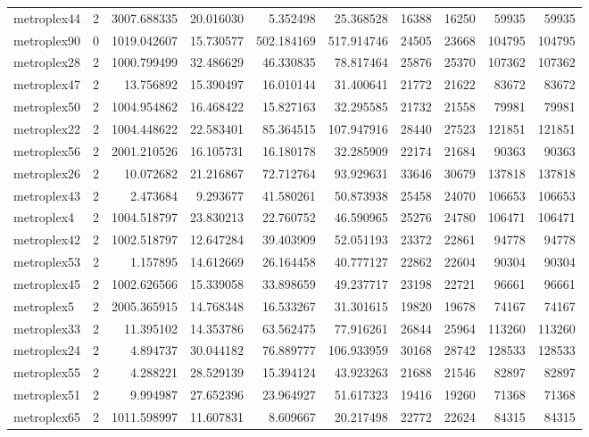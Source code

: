 \begin{longtable}{|l|r|r|r|r|r|r|r|r|r|}
metroplex44 & 2 & 3007.688335 & 20.016030 & 5.352498 & 25.368528 & 16388 & 16250 & 59935 & 59935 \\
metroplex90 & 0 & 1019.042607 & 15.730577 & 502.184169 & 517.914746 & 24505 & 23668 & 104795 & 104795 \\
metroplex28 & 2 & 1000.799499 & 32.486629 & 46.330835 & 78.817464 & 25876 & 25370 & 107362 & 107362 \\
metroplex47 & 2 & 13.756892 & 15.390497 & 16.010144 & 31.400641 & 21772 & 21622 & 83672 & 83672 \\
metroplex50 & 2 & 1004.954862 & 16.468422 & 15.827163 & 32.295585 & 21732 & 21558 & 79981 & 79981 \\
metroplex22 & 2 & 1004.448622 & 22.583401 & 85.364515 & 107.947916 & 28440 & 27523 & 121851 & 121851 \\
metroplex56 & 2 & 2001.210526 & 16.105731 & 16.180178 & 32.285909 & 22174 & 21684 & 90363 & 90363 \\
metroplex26 & 2 & 10.072682 & 21.216867 & 72.712764 & 93.929631 & 33646 & 30679 & 137818 & 137818 \\
metroplex43 & 2 & 2.473684 & 9.293677 & 41.580261 & 50.873938 & 25458 & 24070 & 106653 & 106653 \\
metroplex4 & 2 & 1004.518797 & 23.830213 & 22.760752 & 46.590965 & 25276 & 24780 & 106471 & 106471 \\
metroplex42 & 2 & 1002.518797 & 12.647284 & 39.403909 & 52.051193 & 23372 & 22861 & 94778 & 94778 \\
metroplex53 & 2 & 1.157895 & 14.612669 & 26.164458 & 40.777127 & 22862 & 22604 & 90304 & 90304 \\
metroplex45 & 2 & 1002.626566 & 15.339058 & 33.898659 & 49.237717 & 23198 & 22721 & 96661 & 96661 \\
metroplex5 & 2 & 2005.365915 & 14.768348 & 16.533267 & 31.301615 & 19820 & 19678 & 74167 & 74167 \\
metroplex33 & 2 & 11.395102 & 14.353786 & 63.562475 & 77.916261 & 26844 & 25964 & 113260 & 113260 \\
metroplex24 & 2 & 4.894737 & 30.044182 & 76.889777 & 106.933959 & 30168 & 28742 & 128533 & 128533 \\
metroplex55 & 2 & 4.288221 & 28.529139 & 15.394124 & 43.923263 & 21688 & 21546 & 82897 & 82897 \\
metroplex51 & 2 & 9.994987 & 27.652396 & 23.964927 & 51.617323 & 19416 & 19260 & 71368 & 71368 \\
metroplex65 & 2 & 1011.598997 & 11.607831 & 8.609667 & 20.217498 & 22772 & 22624 & 84315 & 84315 \\

\end{longtable}
